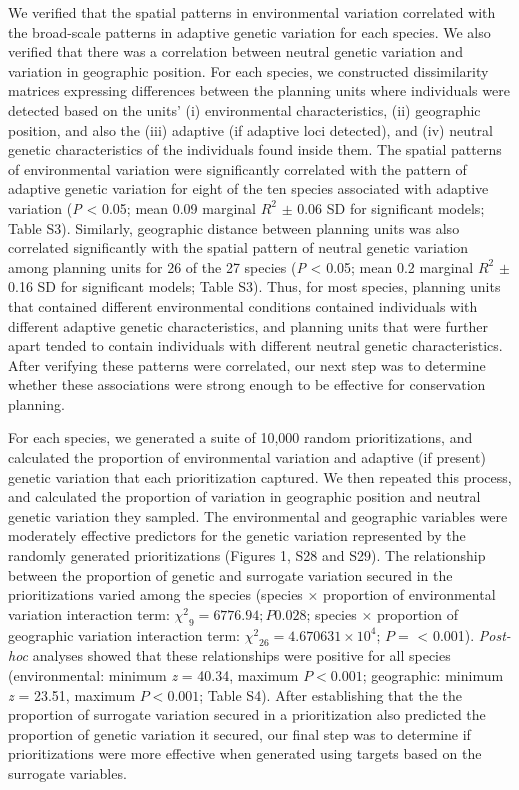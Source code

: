 \documentclass[9pt,twocolumn,twoside,lineno]{pnas-new}
\begin{document}
We verified that the spatial patterns in environmental variation
correlated with the broad-scale patterns in adaptive genetic variation
for each species. We also verified that there was a correlation between
neutral genetic variation and variation in geographic position. For each
species, we constructed dissimilarity matrices expressing differences
between the planning units where individuals were detected based on the
units' (i) environmental characteristics, (ii) geographic position, and
also the (iii) adaptive (if adaptive loci detected), and (iv) neutral
genetic characteristics of the individuals found inside them. The
spatial patterns of environmental variation were significantly
correlated with the pattern of adaptive genetic variation for eight of
the ten species associated with adaptive variation (\emph{P} \textless{}
0.05; mean 0.09 marginal \(R^2\) \(\pm\) 0.06 SD for significant models;
Table S3). Similarly, geographic distance between planning units was
also correlated significantly with the spatial pattern of neutral
genetic variation among planning units for 26 of the 27 species
(\emph{P} \textless{} 0.05; mean 0.2 marginal \(R^2\) \(\pm\) 0.16 SD
for significant models; Table S3). Thus, for most species, planning
units that contained different environmental conditions contained
individuals with different adaptive genetic characteristics, and
planning units that were further apart tended to contain individuals
with different neutral genetic characteristics. After verifying these
patterns were correlated, our next step was to determine whether these
associations were strong enough to be effective for conservation
planning.

For each species, we generated a suite of 10,000 random prioritizations,
and calculated the proportion of environmental variation and adaptive
(if present) genetic variation that each prioritization captured. We
then repeated this process, and calculated the proportion of variation
in geographic position and neutral genetic variation they sampled. The
environmental and geographic variables were moderately effective
predictors for the genetic variation represented by the randomly
generated prioritizations (Figures 1, S28 and S29). The relationship
between the proportion of genetic and surrogate variation secured in the
prioritizations varied among the species (species \(\times\) proportion
of environmental variation interaction term:
\({\chi^2}_{9} = {6776.94}; P 0.028\); species \(\times\) proportion of
geographic variation interaction term:
\({\chi^2}_{26} = 4.670631\times 10^{4}\); \(P =\) \textless{} 0.001).
\emph{Post-hoc} analyses showed that these relationships were positive
for all species (environmental: minimum \textit{z} = 40.34, maximum
\(P < 0.001\); geographic: minimum \textit{z} = 23.51, maximum
\(P < 0.001\); Table S4). After establishing that the the proportion of
surrogate variation secured in a prioritization also predicted the
proportion of genetic variation it secured, our final step was to
determine if prioritizations were more effective when generated using
targets based on the surrogate variables.
\end{document}
